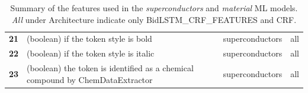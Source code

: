 \documentclass[]{interact}
\theoremstyle{plain}%
\theoremstyle{definition}
\theoremstyle{remark}
\begin{document}
\begin{table}[ht]
{\begin{tabular}{l m{30em} c c}
            \textbf{21}   & (boolean) if the token style is bold                                                                                                                                                                                                                     & superconductors & all                   \\
            \textbf{22}   & (boolean) if the token style is italic                                                                                                                                                                                                                   & superconductors & all                   \\
            \textbf{23}   & (boolean) the token is identified as a chemical compound by ChemDataExtractor\cite{chemdataextractor}                                                                                                                                                    & superconductors & all                   \\
            \bottomrule
        \end{tabular}
    }
    \caption{Summary of the features used in the \textit{superconductors} and \textit{material} ML models. \textit{All} under Architecture indicate only BidLSTM\_CRF\_FEATURES and CRF.}
    \label{tab:ML-model-features}
\end{table}

\end{document}
